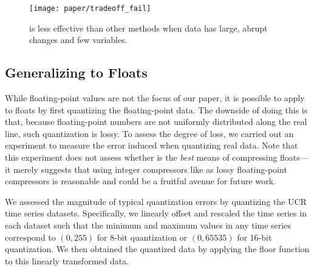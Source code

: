 



\begin{figure}[h]
\begin{center}
    \texttt{[image: paper/tradeoff\_fail]}
    \caption{\minesp is less effective than other methods when data has large, abrupt changes and few variables.}
    \label{fig:tradeoff_failure}
\end{center}
\end{figure}

\subsection{Generalizing to Floats}

While floating-point values are not the focus of our paper, it is possible to apply \minesp to floats by first quantizing the floating-point data. The downside of doing this is that, because floating-point numbers are not uniformly distributed along the real line, such quantization is lossy. To assess the degree of loss, we carried out an experiment to measure the error induced when quantizing real data. Note that this experiment does not assess whether \minesp is the \textit{best} means of compressing floats---it merely suggests that using integer compressors like \minesp as lossy floating-point compressors is reasonable and could be a fruitful avenue for future work. %

We assessed the magnitude of typical quantization errors by quantizing the UCR time series datasets. Specifically, we linearly offset and rescaled the time series in each dataset such that the minimum and maximum values in any time series correspond to $(0, 255)$ for 8-bit quantization or $(0, 65535)$ for 16-bit quantization. We then obtained the quantized data by applying the floor function to this linearly transformed data.

